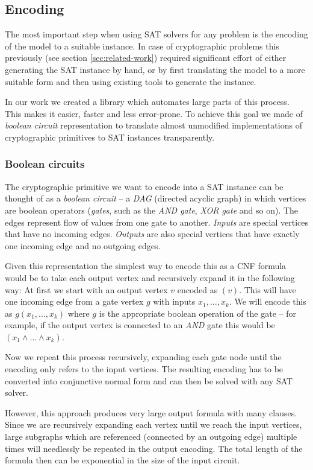 \subsection{Encoding}
The most important step when using SAT solvers for any problem is the encoding of the model to a suitable instance.
In case of cryptographic problems this previously (see section \ref{sec:related-work}) required significant effort of either generating the SAT instance by hand, or by first translating the model to a more suitable form and then using existing tools to generate the instance.

In our work we created a library which automates large parts of this process.
This makes it easier, faster and less error-prone.
To achieve this goal we made of \emph{boolean circuit} representation to translate almost unmodified implementations of cryptographic primitives to SAT instances transparently.

\subsubsection{Boolean circuits}
The cryptographic primitive we want to encode into a SAT instance can be thought of as a \emph{boolean circuit} -- a \emph{DAG} (directed acyclic graph) in which vertices are boolean operators (\emph{gates}, such as the \emph{AND gate}, \emph{XOR gate} and so on).
The edges represent flow of values from one gate to another.
\emph{Inputs} are special vertices that have no incoming edges.
\emph{Outputs} are also special vertices that have exactly one incoming edge and no outgoing edges.

Given this representation the simplest way to encode this as a CNF formula would be to take each output vertex and recursively expand it in the following way:
At first we start with an output vertex $v$ encoded as $(v)$.
This will have one incoming edge from a gate vertex $g$ with inputs $x_1, \dots, x_k$.
We will encode this as $g(x_1, \dots, x_k)$ where $g$ is the appropriate boolean operation of the gate -- for example, if the output vertex is connected to an \emph{AND} gate this would be $(x_1 \land \dots \land x_k)$.

Now we repeat this process recursively, expanding each gate node until the encoding only refers to the input vertices.
The resulting encoding has to be converted into conjunctive normal form and can then be solved with any SAT solver.

However, this approach produces very large output formula with many clauses.
Since we are recursively expanding each vertex until we reach the input vertices, large subgraphs which are referenced (connected by an outgoing edge) multiple times will needlessly be repeated in the output encoding.
The total length of the formula then can be exponential in the size of the input circuit.

